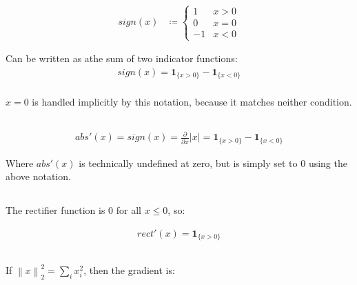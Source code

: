\documentclass[reqno]{amsart}
\theoremstyle{definition}
\theoremstyle{remark}
\numberwithin{equation}{section}
\begin{document}
\subsection{}

\begin{align}
    sign(x) &\coloneqq \begin{cases}
        1 & x > 0 \\
        0 & x = 0 \\
        -1 & x < 0
    \end{cases}
\end{align}

Can be written as athe sum of two indicator functions: \\

\begin{align}
    sign(x) = \textbf{1}_{\{x > 0\}} - \textbf{1}_{\{x < 0\}}
\end{align}\\

$x = 0$ is handled implicitly by this notation, because it matches neither condition.


\subsection{}

\begin{align}
    abs'(x) = sign(x) = \frac{ \partial }{ \partial x } |x| = \textbf{1}_{\{x > 0\}} - \textbf{1}_{\{x < 0\}}
\end{align}

Where $abs'(x)$ is technically undefined at zero, but is simply set to 0 using the above notation.

\subsection{}

The rectifier function is 0 for all $x \leq 0$, so:

\begin{align}
    rect'(x) = \textbf{1}_{\{x > 0\}} 
\end{align}

\newcommand\norm[1]{\left\lVert#1\right\rVert}

\subsection{}

If $\norm{x}^2_{2} = \sum_{i} x_i^2$, then the gradient is: \\
\end{document}
